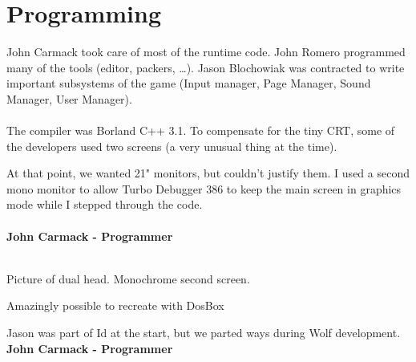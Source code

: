 \documentclass[book.tex]{subfiles}
\begin{document}
\section{Programming}

John Carmack took care of most of the runtime code. John Romero programmed many of the tools (editor, packers, …). Jason Blochowiak was contracted to write important subsystems of the game (Input manager, Page Manager, Sound Manager, User Manager).\\
\\
The compiler was Borland C++ 3.1. To compensate for the tiny CRT, some of the developers used two screens (a very unusual thing at the time).\\
\begin{fancyquotes}
At that point, we wanted 21" monitors, but couldn't justify them.  I used a second mono monitor to allow Turbo Debugger 386 to keep the main screen in graphics mode while I stepped through the code.\\
 \\
\textbf{John Carmack - Programmer}
\end{fancyquotes}
\\
Picture of dual head. Monochrome second screen.

Amazingly possible to recreate with DosBox


\begin{fancyquotes}
Jason was part of Id at the start, but we parted ways during Wolf development.
 \bigskip \\
\textbf{John Carmack - Programmer}
 \end{fancyquotes}
 
 
 
\end{document}
